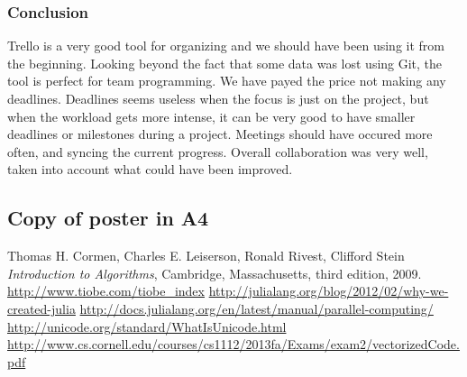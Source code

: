 \documentclass[a4paper, 11pt, titlepage]{article}
\begin{document}
\subsubsection{Conclusion}
Trello is a very good tool for organizing and we should have been using it from the beginning. Looking beyond the fact that some data was lost using Git, the tool is perfect for team programming. We have payed the price not making any deadlines. Deadlines seems useless when the focus is just on the project, but when the workload gets more intense, it can be very good to have smaller deadlines or milestones during a project. Meetings should have occured more often, and syncing the current progress. Overall collaboration was very well, taken into account what could have been improved.

\subsection{Copy of poster in A4}

\begin{thebibliography}{9}
	
	Thomas H. Cormen, Charles E. Leiserson, Ronald Rivest, Clifford Stein
	\emph{Introduction to Algorithms},
	Cambridge, Massachusetts,
	third edition,
	2009.
	\url{http://www.tiobe.com/tiobe\_index}
	\url{http://julialang.org/blog/2012/02/why-we-created-julia}
	\url{http://docs.julialang.org/en/latest/manual/parallel-computing/}
	\url{http://unicode.org/standard/WhatIsUnicode.html}
	\url{http://www.cs.cornell.edu/courses/cs1112/2013fa/Exams/exam2/vectorizedCode.pdf}
	
\end{thebibliography}
\end{document}

